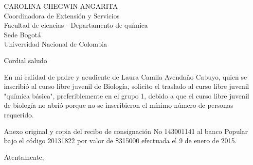 \documentclass[letterpaper,spanish,11pt]{letter}
\date{5 de marzo de 2015}
\begin{document}
\begin{letter}{CAROLINA CHEGWIN ANGARITA\\Coordinadora de  Extensión y Servicios\\Facultad de ciencias - Departamento de química\\Sede Bogotá\\Universidad Nacional de Colombia}
	
\opening{Cordial saludo}
En mi calidad de padre y acudiente de Laura Camila Avendaño Cabuyo, quien se inscribió al curso libre juvenil de Biología, solicito el traslado al curso libre juvenil "química básica", preferiblemente en el grupo 1, debido a que el curso libre juvenil de biología no abrió porque no se inscribieron el mínimo número de personas requerido.

Anexo original y copia del recibo de consignación No 143001141 al banco Popular bajo el código 20131822 por valor de \$315000 efectuada el 9 de enero de 2015.
\closing{Atentamente,}


\end{letter}
\end{document}
